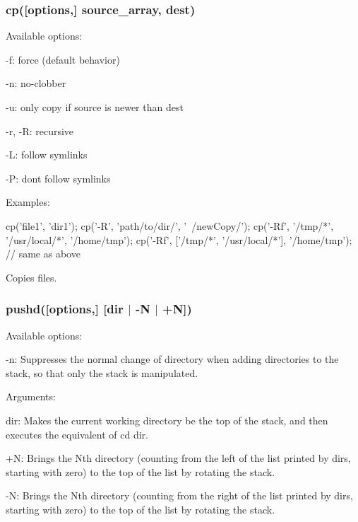 \subsubsection*{cp(\mbox{[}options,\mbox{]} source\+\_\+array, dest)}

Available options\+:


\begin{DoxyItemize}
\item {\ttfamily -\/f}\+: force (default behavior)
\item {\ttfamily -\/n}\+: no-\/clobber
\item {\ttfamily -\/u}\+: only copy if source is newer than dest
\item {\ttfamily -\/r}, {\ttfamily -\/R}\+: recursive
\item {\ttfamily -\/L}\+: follow symlinks
\item {\ttfamily -\/P}\+: don\textquotesingle{}t follow symlinks
\end{DoxyItemize}

Examples\+:


\begin{DoxyCode}
cp('file1', 'dir1');
cp('-R', 'path/to/dir/', '~/newCopy/');
cp('-Rf', '/tmp/*', '/usr/local/*', '/home/tmp');
cp('-Rf', ['/tmp/*', '/usr/local/*'], '/home/tmp'); // same as above
\end{DoxyCode}


Copies files.

\subsubsection*{pushd(\mbox{[}options,\mbox{]} \mbox{[}dir $\vert$ \textquotesingle{}-\/N\textquotesingle{} $\vert$ \textquotesingle{}+N\textquotesingle{}\mbox{]})}

Available options\+:


\begin{DoxyItemize}
\item {\ttfamily -\/n}\+: Suppresses the normal change of directory when adding directories to the stack, so that only the stack is manipulated.
\end{DoxyItemize}

Arguments\+:


\begin{DoxyItemize}
\item {\ttfamily dir}\+: Makes the current working directory be the top of the stack, and then executes the equivalent of {\ttfamily cd dir}.
\item {\ttfamily +N}\+: Brings the Nth directory (counting from the left of the list printed by dirs, starting with zero) to the top of the list by rotating the stack.
\item {\ttfamily -\/N}\+: Brings the Nth directory (counting from the right of the list printed by dirs, starting with zero) to the top of the list by rotating the stack.
\end{DoxyItemize}

